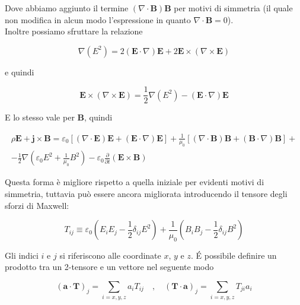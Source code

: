 Dove abbiamo aggiunto il termine $(\nabla \cdot \mathbf{B}) \mathbf{B}$ per motivi di simmetria (il quale non modifica in alcun modo l'espressione in quanto $\nabla \cdot \mathbf{B} = 0$).\\
Inoltre possiamo sfruttare la relazione

\begin{equation*}
    \nabla (E^2) = 2(\mathbf{E} \cdot \nabla) \mathbf{E} + 2 \mathbf{E} \times (\nabla \times \mathbf{E}) 
\end{equation*}

e quindi 

\begin{equation}
    \mathbf{E} \times (\nabla \times \mathbf{E}) = \frac{1}{2} \nabla (E^2) - (\mathbf{E} \cdot \nabla) \mathbf{E}
\end{equation}

E lo stesso vale per $\mathbf{B}$, quindi

\begin{align}
    \rho \mathbf{E} + \mathbf{j} \times \mathbf{B} = \varepsilon_0 [(\nabla \cdot \mathbf{E})\mathbf{E} + (\mathbf{E} \cdot \nabla) \mathbf{E}] + \frac{1}{\mu_0} [(\nabla \cdot \mathbf{B})\mathbf{B} + (\mathbf{B} \cdot \nabla)\mathbf{B}] + \\
    - \frac{1}{2} \nabla \left( \varepsilon_0 E^2 + \frac{1}{\mu_0} B^2 \right) - \varepsilon_0 \frac{\partial}{\partial t}(\mathbf{E} \times \mathbf{B})
\end{align}

Questa forma è migliore rispetto a quella iniziale per evidenti motivi di simmetria, tuttavia può essere ancora migliorata introducendo il tensore degli sforzi di Maxwell:  

\begin{tcolorbox}[colback=yellow!10!white, colframe=orange!70!black, boxrule=0.8pt]
\begin{equation}
    T_{ij} \equiv \varepsilon_0 \left( E_i E_j - \frac{1}{2}\delta_{ij} E^2 \right) + \frac{1}{\mu_0} \left( B_i B_j - \frac{1}{2}\delta_{ij} B^2\right)
\end{equation}
\end{tcolorbox}

Gli indici $i$ e $j$ si riferiscono alle coordinate $x$, $y$ e $z$. \'E possibile definire un prodotto tra un 2-tensore e un vettore nel seguente modo 

\begin{equation}
    \left( \mathbf{a} \cdot \mathbf{T} \right)_j = \sum_{i = x,y,z} a_i T_{ij}  \quad , \quad \left( \mathbf{T} \cdot \mathbf{a}\right)_j = \sum_{i = x,y,z} T_{ji} a_i
\end{equation}


